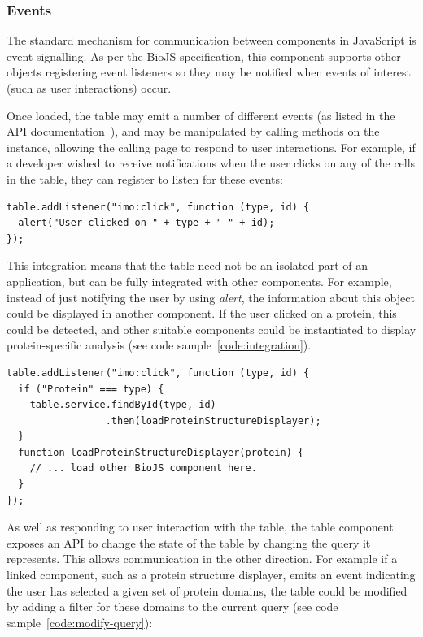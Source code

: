 \documentclass[10pt,a4paper,twocolumn]{article}
\begin{document}
\subsubsection*{Events}

The standard mechanism for communication between components in JavaScript is
event signalling. As per the BioJS specification, this component supports other
objects registering event listeners so they may be notified when events of
interest (such as user interactions) occur.

Once loaded, the table may emit a number of different events (as listed in the
API documentation~\cite{site:biojs-doc}), and may be manipulated by calling 
methods on the instance, allowing the calling page to respond to 
user interactions. For example, if a developer wished to receive notifications 
when the user clicks on any of the cells in the table, they can register to 
listen for these events:

\begin{lstlisting}[caption={Adding an Event Listener}, label={code:add-listener}]
table.addListener("imo:click", function (type, id) {
  alert("User clicked on " + type + " " + id);
});
\end{lstlisting}

This integration means that the table need not be an isolated part of an
application, but can be fully integrated with other components. For example,
instead of just notifying the user by using \emph{alert}, the information about
this object could be displayed in another component. If the user clicked on a
protein, this could be detected, and other suitable components could be
instantiated to display protein-specific analysis (see code
sample~\ref{code:integration}).

\begin{lstlisting}[caption={Integrating with Other Components - Example 1}, label={code:integration}]
table.addListener("imo:click", function (type, id) {
  if ("Protein" === type) {
    table.service.findById(type, id)
                 .then(loadProteinStructureDisplayer);
  }
  function loadProteinStructureDisplayer(protein) {
    // ... load other BioJS component here.
  }
});
\end{lstlisting}

As well as responding to user interaction with the table, the table component
exposes an API to change the state of the table by changing the query it
represents. This allows communication in the other direction. For example if a
linked component, such as a protein structure displayer, emits an event
indicating the user has selected a given set of protein domains, the table could
be modified by adding a filter for these domains to the current query (see code
sample~\ref{code:modify-query}):
\end{document}
